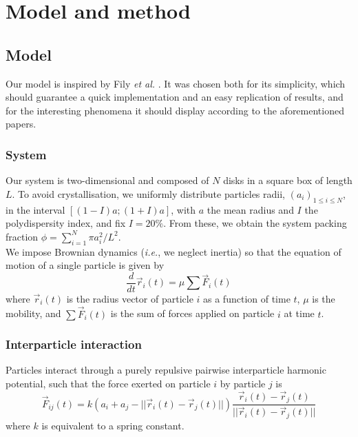 \documentclass[class=report, float=false, crop=false]{standalone}
\begin{document}
\chapter{Model and method}
\label{chap:model}

\section{Model}

Our model is inspired by Fily \textit{et al.} \cite{fily2012athermal, fily2014freezing}. It was chosen both for its simplicity, which should guarantee a quick implementation and an easy replication of results, and for the interesting phenomena it should display according to the aforementioned papers.

\subsection{System}

Our system is two-dimensional and composed of $N$ disks in a square box of length $L$. To avoid crystallisation, we uniformly distribute particles radii, $(a_i)_{1 \leq i \leq N}$, in the interval $[(1-I)a; (1+I)a]$, with $a$ the mean radius and $I$ the polydispersity index, and fix $I=20\%$. From these, we obtain the system packing fraction $\phi = \sum_{i=1}^N \pi a_i^2/L^2$.\\

We impose Brownian dynamics (\textit{i.e.}, we neglect inertia) so that the equation of motion of a single particle is given by
\begin{equation}
\frac{d}{dt}\vec{r}_i(t) = \mu \sum\vec{F}_i(t)
\label{brownian_dynamics}
\end{equation}
where $\vec{r}_i(t)$ is the radius vector of particle $i$ as a function of time $t$, $\mu$ is the mobility, and $\sum\vec{F}_i(t)$ is the sum of forces applied on particle $i$ at time $t$.

\subsection{Interparticle interaction}

Particles interact through a purely repulsive pairwise interparticle harmonic potential, such that the force exerted on particle $i$ by particle $j$ is
\begin{equation}
\vec{F}_{ij}(t) = k(a_i + a_j - ||\vec{r}_i(t) - \vec{r}_j(t)||)\frac{\vec{r}_i(t) - \vec{r}_j(t)}{||\vec{r}_i(t) - \vec{r}_j(t)||}
\label{interparticle_force}
\end{equation}
where $k$ is equivalent to a spring constant.\\
\end{document}
